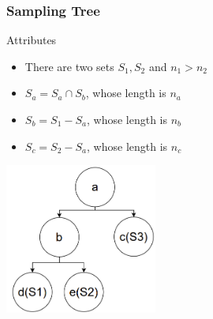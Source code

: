 \documentclass[notheorems, aspectratio=54]{beamer}
\begin{document}
\begin{frame}
    \frametitle{Sampling Tree}
    \begin{block} {Attributes}
        \begin{itemize}
            \item There are two sets $S_1, S_2$ and $n_1 > n_2$
            \item $S_a = S_a\cap S_b$, whose length is $n_a$
            \item $S_b = S_1- S_a$, whose length is $n_b$
            \item $S_c = S_2- S_a$, whose length is $n_c$
        \end{itemize}
    \end{block}
    \centering
    \includegraphics[width=5cm]{global_img_dir/SamplingTree1.png}
\end{frame}
\end{document}
